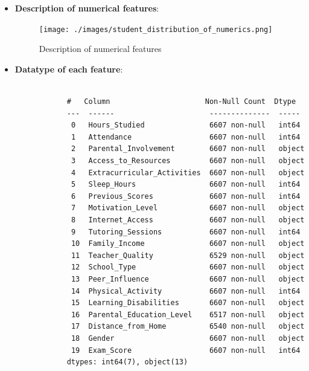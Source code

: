 \documentclass{article}
\begin{document}
\begin{enumerate}
\begin{itemize}
\begin{itemize}
\begin{verbatim}
                ['Near' 'Moderate' 'Far' nan]

            \end{verbatim}

        \end{itemize}

        \newpage
        \item \textbf{Description of numerical features}:
        \begin{figure}[H]  %

            \centering
            \texttt{[image: ./images/student\_distribution\_of\_numerics.png]}  %
            \caption{Description of numerical features}
            \label{fig:Figure_8}  %
        \end{figure}

        \item \textbf{Datatype of each feature}:
        \begin{verbatim}

            #   Column                      Non-Null Count  Dtype 
            ---  ------                      --------------  ----- 
             0   Hours_Studied               6607 non-null   int64 
             1   Attendance                  6607 non-null   int64 
             2   Parental_Involvement        6607 non-null   object
             3   Access_to_Resources         6607 non-null   object
             4   Extracurricular_Activities  6607 non-null   object
             5   Sleep_Hours                 6607 non-null   int64 
             6   Previous_Scores             6607 non-null   int64 
             7   Motivation_Level            6607 non-null   object
             8   Internet_Access             6607 non-null   object
             9   Tutoring_Sessions           6607 non-null   int64 
             10  Family_Income               6607 non-null   object
             11  Teacher_Quality             6529 non-null   object
             12  School_Type                 6607 non-null   object
             13  Peer_Influence              6607 non-null   object
             14  Physical_Activity           6607 non-null   int64 
             15  Learning_Disabilities       6607 non-null   object
             16  Parental_Education_Level    6517 non-null   object
             17  Distance_from_Home          6540 non-null   object
             18  Gender                      6607 non-null   object
             19  Exam_Score                  6607 non-null   int64 
            dtypes: int64(7), object(13)


\end{verbatim}
\end{itemize}
\end{enumerate}
\end{document}
